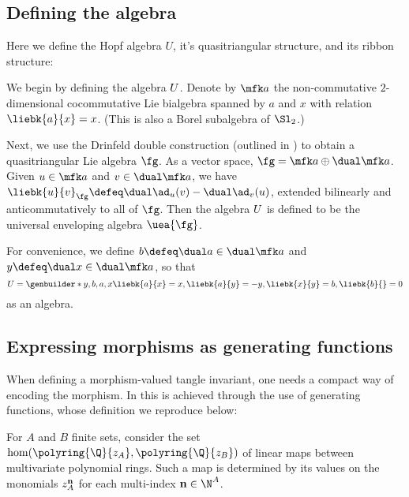 \documentclass{article}
\begin{document}
\subsection{Defining the algebra}
Here we define the Hopf algebra $U$, it's quasitriangular structure, and its
ribbon structure:

We begin by defining the algebra $U$. Denote by $\fa$ the non-commutative
$2$-dimensional cocommutative Lie bialgebra spanned by $a$ and $x$ with relation
$\liebk{a}{x} = x$. (This is also a Borel subalgebra of $\Sl_2$.)

Next, we use the Drinfeld double construction (outlined in \cite{ES}) to obtain
a quasitriangular Lie algebra $\fg$. As a vector space,
$\fg = \fa \oplus \dual\fa$. Given $u \in \fa$ and $v\in \dual \fa$, we have
$\liebk{u}{v}_{\fg} \defeq \dual\ad_u(v) - \dual\ad_v(u)$, extended bilinearly
and anticommutatively to all of $\fg$.
Then the algebra $U$ is defined to be the universal enveloping algebra
$\uea{\fg}$.

\begin{remark}
        For convenience, we define $b \defeq \dual a \in \dual\fa$ and
        $y \defeq \dual x \in \dual\fa$, so that
        \begin{equation}
                U = \genbuilder*{y, b, a, x}{
                        \liebk{a}{x} = x,
                        \liebk{a}{y} = -y,
                        \liebk{x}{y} = b,
                        \liebk{b}{ } = 0
                }
        \end{equation}
        as an algebra.
\end{remark}


\subsection{Expressing morphisms as generating functions}

When defining a morphism-valued tangle invariant, one needs a compact way of
encoding the morphism. In \cite{BV} this is achieved through the use of
generating functions, whose definition we reproduce below:

For $A$ and $B$ finite sets, consider the set $\hom(\polyring{\Q}{z_A},
\polyring{\Q}{z_B})$ of linear maps between multivariate polynomial rings. Such
a map is determined by its values on the monomials $z_A^{\mathbf{n}}$ for each
multi-index $\nn \in \N^A$.
\end{document}
